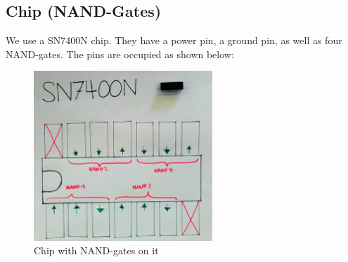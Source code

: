 \documentclass[10pt,a4paper]{article}
\begin{document}
\newpage
\subsection{Chip (NAND-Gates)}
We use a SN7400N chip. They have a power pin, a ground pin, as well as four NAND-gates. The pins are occupied as shown below:
    \begin{figure}[H]
      \centering
      \includegraphics[width=0.6\textwidth]{sn7400n}%
      \caption{Chip with NAND-gates on it}%
      \label{fig:sn7400n}
    \end{figure}   
\end{document}
